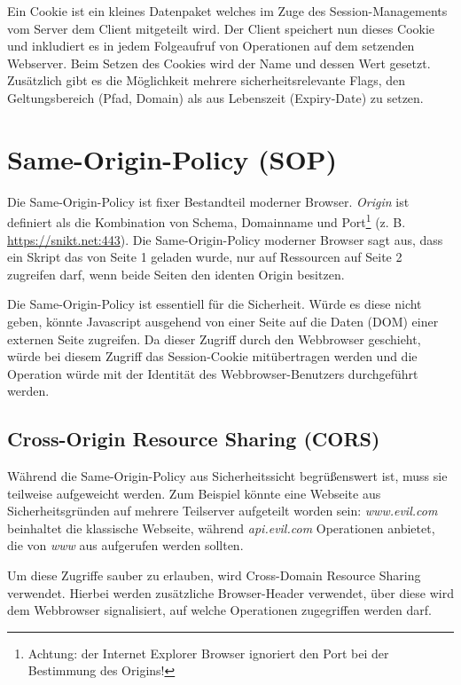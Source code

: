 Ein Cookie ist ein kleines Datenpaket welches im Zuge des Session-Managements vom Server dem Client mitgeteilt wird. Der Client speichert nun dieses Cookie und inkludiert es in jedem Folgeaufruf von Operationen auf dem setzenden Webserver. Beim Setzen des Cookies wird der Name und dessen Wert gesetzt. Zusätzlich gibt es die Möglichkeit mehrere sicherheitsrelevante Flags, den Geltungsbereich (Pfad, Domain) als aus Lebenszeit (Expiry-Date) zu setzen.

\section{Same-Origin-Policy (SOP)}

Die Same-Origin-Policy ist fixer Bestandteil moderner Browser. \textit{Origin} ist definiert als die Kombination von Schema, Domainname und Port\footnote{Achtung: der Internet Explorer Browser ignoriert den Port bei der Bestimmung des Origins!} (z. B. \url{https://snikt.net:443}). Die Same-Origin-Policy moderner Browser sagt aus, dass ein Skript das von Seite 1 geladen wurde, nur auf Ressourcen auf Seite 2 zugreifen darf, wenn beide Seiten den identen Origin besitzen.

Die Same-Origin-Policy ist essentiell für die Sicherheit. Würde es diese nicht geben, könnte Javascript ausgehend von einer Seite auf die Daten (DOM) einer externen Seite zugreifen. Da dieser Zugriff durch den Webbrowser geschieht, würde bei diesem Zugriff das Session-Cookie mitübertragen werden und die Operation würde mit der Identität des Webbrowser-Benutzers durchgeführt werden.

\subsection{Cross-Origin Resource Sharing (CORS)}

Während die Same-Origin-Policy aus Sicherheitssicht begrüßenswert ist, muss sie teilweise aufgeweicht werden. Zum Beispiel könnte eine Webseite aus Sicherheitsgründen auf mehrere Teilserver aufgeteilt worden sein: \textit{www.evil.com} beinhaltet die klassische Webseite, während \textit{api.evil.com} Operationen anbietet, die von \textit{www} aus aufgerufen werden sollten.

Um diese Zugriffe sauber zu erlauben, wird Cross-Domain Resource Sharing verwendet. Hierbei werden zusätzliche Browser-Header verwendet, über diese wird dem Webbrowser signalisiert, auf welche Operationen zugegriffen werden darf.

